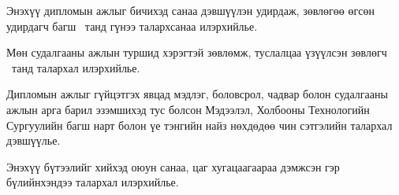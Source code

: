 \begin{acknowledgements}
\addchaptertocentry{\acknowledgementname}

Энэхүү дипломын ажлыг бичихэд санаа дэвшүүлэн удирдаж, зөвлөгөө өгсөн удирдагч багш \supname\ танд гүнээ талархсанаа илэрхийлье.

Мөн судалгааны ажлын туршид хэрэгтэй зөвлөмж, туслалцаа үзүүлсэн зөвлөгч \advicenameA\ танд талархал илэрхийлье.

Дипломын ажлыг гүйцэтгэх явцад мэдлэг, боловсрол, чадвар болон судалгааны ажлын арга барил эзэмшихэд тус болсон Мэдээлэл, Холбооны Технологийн Сургуулийн багш нарт болон үе тэнгийн найз нөхдөдөө чин сэтгэлийн талархал дэвшүүлье.

Энэхүү бүтээлийг хийхэд оюун санаа, цаг хугацаагаараа дэмжсэн гэр бүлийнхэндээ талархал илэрхийлье.

\end{acknowledgements}
